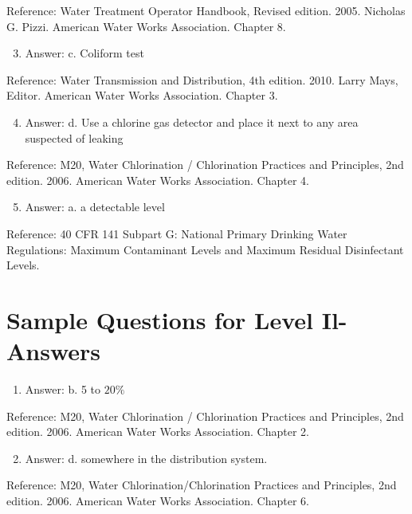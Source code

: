 \documentclass[10pt]{article}
\begin{document}
Reference: Water Treatment Operator Handbook, Revised edition. 2005. Nicholas G. Pizzi. American Water Works Association. Chapter 8.

\begin{enumerate}
  \setcounter{enumi}{2}
  \item Answer: c. Coliform test
\end{enumerate}

Reference: Water Transmission and Distribution, 4th edition. 2010. Larry Mays, Editor. American Water Works Association. Chapter 3.

\begin{enumerate}
  \setcounter{enumi}{3}
  \item Answer: d. Use a chlorine gas detector and place it next to any area suspected of leaking
\end{enumerate}

Reference: M20, Water Chlorination / Chlorination Practices and Principles, 2nd edition. 2006. American Water Works Association. Chapter 4.

\begin{enumerate}
  \setcounter{enumi}{4}
  \item Answer: a. a detectable level
\end{enumerate}

Reference: 40 CFR 141 Subpart G: National Primary Drinking Water Regulations: Maximum Contaminant Levels and Maximum Residual Disinfectant Levels.

\section{Sample Questions for Level Il-Answers}
\begin{enumerate}
  \item Answer: b. 5 to $20 \%$
\end{enumerate}

Reference: M20, Water Chlorination / Chlorination Practices and Principles, 2nd edition. 2006. American Water Works Association. Chapter 2.

\begin{enumerate}
  \setcounter{enumi}{1}
  \item Answer: d. somewhere in the distribution system.
\end{enumerate}

Reference: M20, Water Chlorination/Chlorination Practices and Principles, 2nd edition. 2006. American Water Works Association. Chapter 6.
\end{document}
